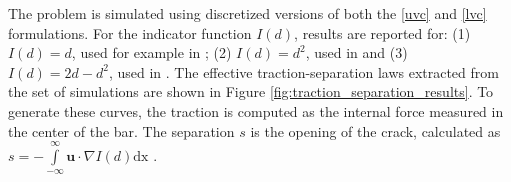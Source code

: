 The problem is simulated using discretized versions of both the \ref{uvc} and \eqref{lvc} formulations.  
For the indicator function $I(d)$, results are reported for: (1) $I(d) = d$, used for example in \cite{bourdin2012variational}; (2) $I(d) = d^2$, used in \cite{jiang2022phase} and (3) $I(d) = 2d-d^2$, used in \cite{wheeler2014augmented}.
The effective traction-separation laws extracted from the set of simulations are shown in Figure \ref{fig:traction_separation_results}. To generate these curves, the traction is computed as the internal force measured in the center of the bar. The separation $s$ is the opening of the crack, calculated as $s = -\int\limits_{-\infty}^{\infty}\textbf{u}\cdot\nabla I(d) \text{dx}$ \cite{bourdin2012variational}. 


